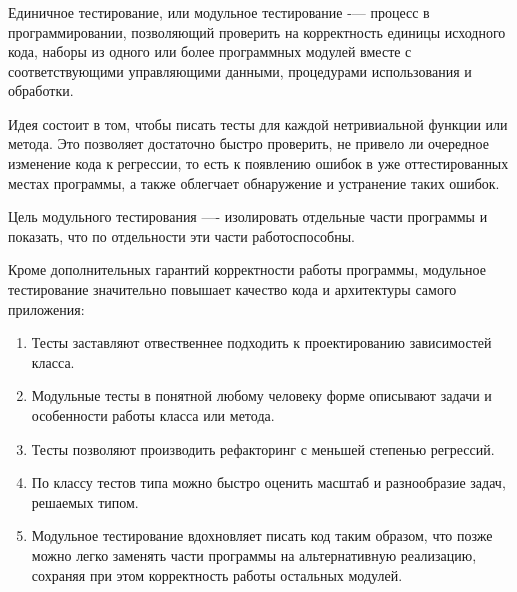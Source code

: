 \subsubsection{}
\label{sec:testing:unit:defenition}

Единичное тестирование, или модульное тестирование -— процесс в программировании, позволяющий проверить на корректность единицы исходного кода, наборы из одного или более программных модулей вместе с соответствующими управляющими данными, процедурами использования и обработки.

Идея состоит в том, чтобы писать тесты для каждой нетривиальной функции или метода. Это позволяет достаточно быстро проверить, не привело ли очередное изменение кода к регрессии, то есть к появлению ошибок в уже оттестированных местах программы, а также облегчает обнаружение и устранение таких ошибок. 

Цель модульного тестирования —- изолировать отдельные части программы и показать, что по отдельности эти части работоспособны\cite{wiki:unit}.

Кроме дополнительных гарантий корректности работы программы, модульное тестирование значительно повышает качество кода и архитектуры самого приложения:

\begin{enumerate}
	\item Тесты заставляют отвественнее подходить к проектированию зависимостей класса.
	\item Модульные тесты в понятной любому человеку форме описывают задачи и особенности работы класса или метода.
	\item Тесты позволяют производить рефакторинг с меньшей степенью регрессий.
	\item По классу тестов типа можно быстро оценить масштаб и разнообразие задач, решаемых типом.
	\item Модульное тестирование вдохновляет писать код таким образом, что позже можно легко заменять части программы на альтернативную реализацию, сохраняя при этом корректность работы остальных модулей.
\end{enumerate}
